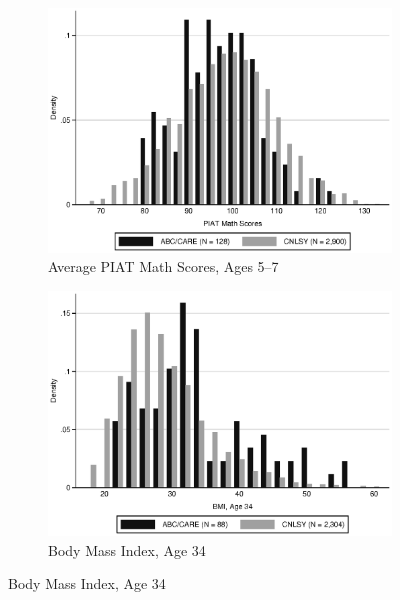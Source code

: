 \begin{figure}[H]
	\ContinuedFloat
	\begin{subfigure}[h]{0.9\textwidth}
	\centering
	\caption{Average PIAT Math Scores, Ages 5--7} \label{fig:support_math}
	\includegraphics[width=\textwidth]{AppOutput/Methodology/support_math.eps}
	\end{subfigure}
	
	\begin{subfigure}[h]{0.9\textwidth}
	\centering
	\caption{Body Mass Index, Age 34} \label{fig:support_bmi}
	\includegraphics[width=\textwidth]{AppOutput/Methodology/support_bmi.eps}
	\end{subfigure}
	
\end{figure}

